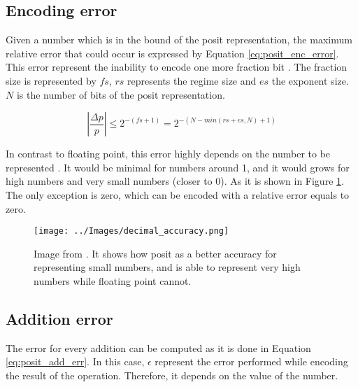 \subsection{Encoding error}
Given a number which is in the bound of the posit representation, the maximum relative error that could occur is expressed by Equation \ref{eq:posit_enc_error}. This error represent the inability to encode one more fraction bit . The fraction size is represented by $fs$, $rs$ represents the regime size and $es$ the exponent size. $N$ is the number of bits of the posit representation.

\begin{equation}
	\left |\frac{\Delta p}{p} \right| \leq 2^{-(fs+1)} = 2^{-(N-min(rs+es, N)+1)}
	\label{eq:posit_enc_error}
\end{equation}

In contrast to floating point, this error highly depends on the number to be represented . It would be minimal for numbers around 1, and it would grows for high numbers and very small numbers (closer to 0). As it is shown in Figure \ref{fig:bfp}. The only exception is zero, which can be encoded with a relative error equals to zero.

\begin{figure}[!ht]
	\centering
	\texttt{[image: ../Images/decimal\_accuracy.png]}
	\caption{Image from \cite{bfp}. It shows how posit as a better accuracy for representing small numbers, and is able to represent very high numbers while floating point cannot. }
	\label{fig:bfp}
\end{figure}


\subsection{Addition error}
The error for every addition can be computed as it is done in Equation \ref{eq:posit_add_err}. In this case, $\epsilon$ represent the error performed while encoding the result of the operation. Therefore, it depends on the value of the number. 

